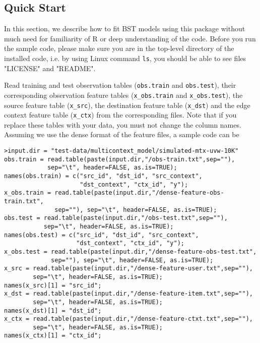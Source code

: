 
\subsection{Quick Start}
\label{sec:bst-quick-start}

In this section, we describe how to fit BST models using this package without much need for familiarity of R or deep understanding of the code. Before you run the sample code, please make sure you are in the top-level directory of the installed code, i.e. by using Linux command {\tt ls}, you should be able to see files "LICENSE" and "README".

Read training and test observation tables ({\tt obs.train} and {\tt obs.test}), their corresponding observation feature tables ({\tt x\_obs.train} and {\tt x\_obs.test}), the source feature table ({\tt x\_src}), the destination feature table ({\tt x\_dst}) and the edge context feature table ({\tt x\_ctx}) from the corresponding files.  Note that if you replace these tables with your data, you must not change the column names. Assuming we use the dense format of the feature files, a sample code can be
{\small\begin{verbatim}
>input.dir = "test-data/multicontext_model/simulated-mtx-uvw-10K"
obs.train = read.table(paste(input.dir,"/obs-train.txt",sep=""), 
            sep="\t", header=FALSE, as.is=TRUE);
names(obs.train) = c("src_id", "dst_id", "src_context", 
                     "dst_context", "ctx_id", "y");
x_obs.train = read.table(paste(input.dir,"/dense-feature-obs-train.txt",
              sep=""), sep="\t", header=FALSE, as.is=TRUE);
obs.test = read.table(paste(input.dir,"/obs-test.txt",sep=""), 
           sep="\t", header=FALSE, as.is=TRUE);
names(obs.test) = c("src_id", "dst_id", "src_context", 
                    "dst_context", "ctx_id", "y");
x_obs.test = read.table(paste(input.dir,"/dense-feature-obs-test.txt",
             sep=""), sep="\t", header=FALSE, as.is=TRUE);
x_src = read.table(paste(input.dir,"/dense-feature-user.txt",sep=""),
        sep="\t", header=FALSE, as.is=TRUE);
names(x_src)[1] = "src_id";
x_dst = read.table(paste(input.dir,"/dense-feature-item.txt",sep=""),
        sep="\t", header=FALSE, as.is=TRUE);
names(x_dst)[1] = "dst_id";
x_ctx = read.table(paste(input.dir,"/dense-feature-ctxt.txt",sep=""),
        sep="\t", header=FALSE, as.is=TRUE);
names(x_ctx)[1] = "ctx_id";
\end{verbatim}}

